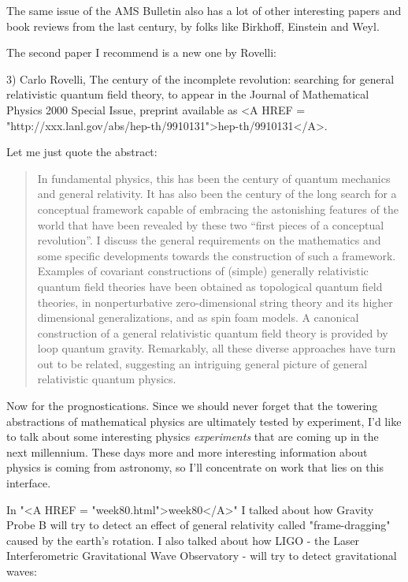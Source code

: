 The same issue of the AMS Bulletin also has a lot of other interesting
papers and book reviews from the last century, by folks like Birkhoff, 
Einstein and Weyl.

The second paper I recommend is a new one by Rovelli:

3) Carlo Rovelli, The century of the incomplete revolution: searching 
for general relativistic quantum field theory, to appear in the
Journal of Mathematical Physics 2000 Special Issue, preprint available
as <A HREF = "http://xxx.lanl.gov/abs/hep-th/9910131">hep-th/9910131</A>.  

Let me just quote the abstract:

\begin{quote}
     In fundamental physics, this has been the century of quantum 
     mechanics and general relativity.  It has also been the century 
     of the long search for a conceptual framework capable of embracing 
     the astonishing features of the world that have been revealed by 
     these two ``first pieces of a conceptual revolution''.  I discuss 
     the general requirements on the mathematics and some specific 
     developments towards the construction of such a framework.  Examples 
     of covariant constructions of (simple) generally relativistic 
     quantum field theories have been obtained as topological quantum 
     field theories, in nonperturbative zero-dimensional string theory 
     and its higher dimensional generalizations, and as spin foam models. 
     A canonical construction of a general relativistic quantum field 
     theory is provided by loop quantum gravity.  Remarkably, all these 
     diverse approaches have turn out to be related, suggesting an 
     intriguing general picture of general relativistic quantum physics.

\end{quote}
    
Now for the prognostications.  Since we should never forget that the towering
abstractions of mathematical physics are ultimately tested by experiment, 
I'd like to talk about some interesting physics \emph{experiments} that are 
coming up in the next millennium.  These days more and more interesting
information about physics is coming from astronomy, so I'll concentrate
on work that lies on this interface.

In "<A HREF = "week80.html">week80</A>" I talked about how Gravity Probe B will try to detect an
effect of general relativity called "frame-dragging" caused by the
earth's rotation.   I also talked about how LIGO - the Laser 
Interferometric Gravitational Wave Observatory - will try to detect 
gravitational waves:

